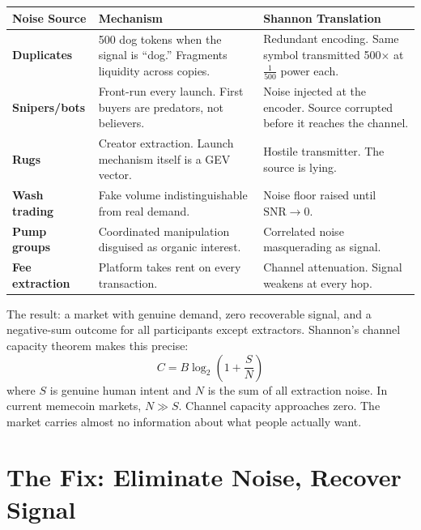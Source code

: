 \documentclass[9pt, letterpaper]{article}
\begin{document}
\vspace{0.2em}
{\small
\renewcommand{\arraystretch}{1.15}
\begin{tabularx}{\textwidth}{@{} l X X @{}}
\toprule
\textbf{Noise Source} & \textbf{Mechanism} & \textbf{Shannon Translation} \\
\midrule
\textbf{Duplicates} & 500 dog tokens when the signal is ``dog.'' Fragments liquidity across copies. & Redundant encoding. Same symbol transmitted 500$\times$ at $\frac{1}{500}$ power each. \\[3pt]
\textbf{Snipers/bots} & Front-run every launch. First buyers are predators, not believers. & Noise injected at the encoder. Source corrupted before it reaches the channel. \\[3pt]
\textbf{Rugs} & Creator extraction. Launch mechanism itself is a GEV vector. & Hostile transmitter. The source is lying. \\[3pt]
\textbf{Wash trading} & Fake volume indistinguishable from real demand. & Noise floor raised until $\text{SNR} \to 0$. \\[3pt]
\textbf{Pump groups} & Coordinated manipulation disguised as organic interest. & Correlated noise masquerading as signal. \\[3pt]
\textbf{Fee extraction} & Platform takes rent on every transaction. & Channel attenuation. Signal weakens at every hop. \\
\bottomrule
\end{tabularx}
}

\vspace{0.3em}
The result: a market with genuine demand, zero recoverable signal, and a negative-sum outcome for all participants except extractors. Shannon's channel capacity theorem makes this precise:
%
\begin{equation}
C = B \log_2\!\left(1 + \frac{S}{N}\right)
\end{equation}
%
where $S$ is genuine human intent and $N$ is the sum of all extraction noise. In current memecoin markets, $N \gg S$. Channel capacity approaches zero. The market carries almost no information about what people actually want.


\section{The Fix: Eliminate Noise, Recover Signal}
\end{document}
